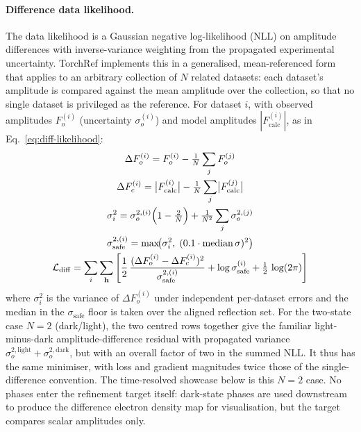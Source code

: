 \documentclass{iucrjournals}
\begin{document}
\paragraph{Difference data likelihood.}
The data likelihood is a Gaussian negative log-likelihood (NLL) on amplitude
differences with inverse-variance weighting from the propagated experimental
uncertainty. TorchRef implements this in a generalised, mean-referenced form
that applies to an arbitrary collection of $N$ related datasets: each dataset's
amplitude is compared against the mean amplitude over the collection, so that no
single dataset is privileged as the reference. For dataset $i$, with
observed amplitudes $F_o^{(i)}$ (uncertainty $\sigma_o^{(i)}$) and model
amplitudes $|F_\mathrm{calc}^{(i)}|$, as in Eq.~\ref{eq:diff-likelihood}:
%
\begin{gather}
  \Delta F_o^{(i)} = F_o^{(i)} - \tfrac{1}{N}\sum_{j} F_o^{(j)} \\
  \Delta F_c^{(i)} = \bigl|F_\mathrm{calc}^{(i)}\bigr|
                      - \tfrac{1}{N}\sum_{j}\bigl|F_\mathrm{calc}^{(j)}\bigr| \\
  \sigma_i^{2} = \sigma_o^{2,(i)}\Bigl(1 - \tfrac{2}{N}\Bigr)
                  + \tfrac{1}{N^{2}}\sum_{j}\sigma_o^{2,(j)} \\
  \sigma_\mathrm{safe}^{2,(i)} = \max\!\bigl(\sigma_i^{2},\;
                                 (0.1\cdot\mathrm{median}\,\sigma)^{2}\bigr) \\
  \mathcal{L}_\mathrm{diff} = \sum_{i}\sum_{\mathbf{h}} \left[
    \frac{1}{2}\,\frac{(\Delta F_o^{(i)} - \Delta F_c^{(i)})^{2}}
                       {\sigma_\mathrm{safe}^{2,(i)}}
    + \log\sigma_\mathrm{safe}^{(i)}
    + \tfrac{1}{2}\,\log(2\pi)
  \right]
  \label{eq:diff-likelihood}
\end{gather}
%
where $\sigma_i^{2}$ is the variance of $\Delta F_o^{(i)}$ under independent
per-dataset errors and the median in the $\sigma_\mathrm{safe}$ floor is taken
over the aligned reflection set. For the two-state case $N=2$ (dark/light), the
two centred rows together give the familiar light-minus-dark amplitude-difference
residual with propagated variance
$\sigma_o^{2,\mathrm{light}}+\sigma_o^{2,\mathrm{dark}}$, but with an overall
factor of two in the summed NLL. It thus has the same minimiser, with loss and
gradient magnitudes twice those of the single-difference convention. The
time-resolved showcase
below is this $N=2$ case.
No phases enter the refinement target itself: dark-state phases are used
downstream to produce the difference electron density map for visualisation,
but the target compares scalar amplitudes only.
\end{document}
